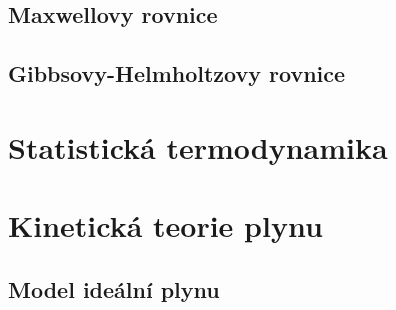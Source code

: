 





\section{Maxwellovy rovnice}

\section{Gibbsovy-Helmholtzovy rovnice}

\chapter{Statistická termodynamika}


\chapter{Kinetická teorie plynu}

\section{Model ideální plynu}
